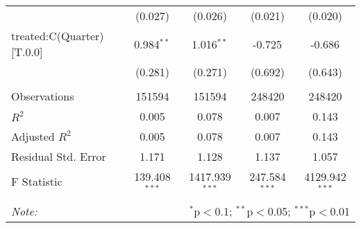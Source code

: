 \begin{tabular}{@{\extracolsep{5pt}}lcccc}
& (0.027) & (0.026) & (0.021) & (0.020) \\
 treated:C(Quarter)[T.0.0] & 0.984$^{**}$ & 1.016$^{**}$ & -0.725$^{}$ & -0.686$^{}$ \\
& (0.281) & (0.271) & (0.692) & (0.643) \\
\hline \\[-1.8ex]
 Observations & 151594 & 151594 & 248420 & 248420 \\
 $R^2$ & 0.005 & 0.078 & 0.007 & 0.143 \\
 Adjusted $R^2$ & 0.005 & 0.078 & 0.007 & 0.143 \\
 Residual Std. Error & 1.171  & 1.128  & 1.137  & 1.057  \\
 F Statistic & 139.408$^{***}$  & 1417.939$^{***}$  & 247.584$^{***}$  & 4129.942$^{***}$  \\
\hline
\hline \\[-1.8ex]
\textit{Note:} & \multicolumn{4}{r}{$^{*}$p$<$0.1; $^{**}$p$<$0.05; $^{***}$p$<$0.01} \\
\end{tabular}
